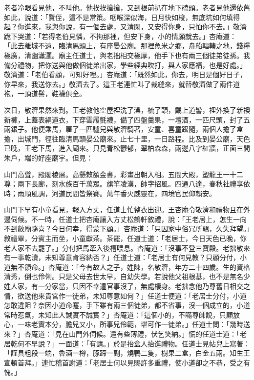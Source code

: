 老者冷眼看見他，不叫他。他挨挨搶搶，又到根前扒在地下磕頭。老者見他還依舊如此，說道：「賢侄，這不是常策。咽喉深似海，日月快如梭，無底坑如何填得起？你進來，我與你說，有一個去處，又清閑，又安得你身，只怕你不去。」敬濟跪下哭道：「若得老伯見憐，不拘那裡，但安下身，小的情願就去。」杏庵道： 「此去離城不遠，臨清馬頭上，有座晏公廟。那裡魚米之鄉，舟船輻輳之地，錢糧極廣，清幽瀟灑。廟主任道士，與老拙相交極厚，他手下也有兩三個徒弟徒孫。我備分禮物，把你送與他做個徒弟出家，學些經典吹打，與人家應福，也是好處。」敬濟道：「老伯看顧，可知好哩。」杏庵道：「既然如此，你去，明日是個好日子，你早來，我送你去。」敬濟去了。這王老連忙叫了裁縫來，就替敬濟做了兩件道袍，一頂道髻，鞋襪俱全。

次日，敬濟果然來到。王老教他空屋裡洗了澡，梳了頭，戴上道髻，裡外換了新襖新褲，上蓋表絹道衣，下穿雲履氈襪，備了四盤羹果，一壇酒，一匹尺頭，封了五兩銀子。他便乘馬，雇了一匹驢兒與敬濟騎著，安童、喜童跟隨，兩個人擔了盒擔，出城門，徑往臨清馬頭晏公廟來。止七十里，一日路程。比及到晏公廟，天色已晚，王老下馬，進入廟來。只見青松鬱郁，翠柏森森，兩邊八字紅牆，正面三間朱戶，端的好座廟宇。但見：

山門高聳，殿閣棱層。高懸敕額金書，彩畫出朝入相。五間大殿，塑龍王一十二尊；兩下長廊，刻水族百千萬眾。旗竿凌漢，帥字招風。四通八達，春秋社禮享依時；雨順風調，河道民間皆祭賽。萬年香火威靈在，四境官民仰賴安。

山門下早有小童看見，報入方丈，任道士忙整衣出迎。王杏庵令敬濟和禮物且在外邊伺候。不一時，任道士把杏庵讓入方丈松鶴軒敘禮，說：「王老居上，怎生一向不到敝廟隨喜？今日何幸，得蒙下顧。」杏庵道：「只因家中俗冗所羈，久失拜望。」敘禮畢，分賓主而坐，小童獻茶。茶罷，任道士道：「老居士，今日天色已晚，你老人家不去罷了。」分付把馬牽入後槽喂息。杏庵道：「沒事不登三寶殿。老拙敬來有一事乾瀆，未知尊意肯容納否？」任道士道：「老居士有何見教？只顧分付，小道無不領命。」杏庵道：「今有故人之子，姓陳，名敬濟，年方二十四歲。生的資格清秀，倒也伶俐。只是父母去世太早，自幼失學。若說他父祖根基，也不是無名少姓人家，有一分家當，只因不幸遭官事沒了，無處棲身。老拙念他乃尊舊日相交之情，欲送他來貴宮作一徒弟，未知尊意如何？」任道士便道：「老居士分付，小道怎敢違阻？奈因小道命蹇，手下雖有兩三個徒弟，都不省事，沒一個成立的，小道常時惹氣，未知此人誠實不誠實？」杏庵道：「這個小的，不瞞尊師說，只顧放心，一味老實本分，膽兒又小，所事兒伶範，堪可作一徒弟。」任道士問：「幾時送來？」杏庵道：「見在山門外伺候。還有些薄禮，伏乞笑納。」慌的任道士道：「老居乾何不早說？」一面道：「有請。」於是抬盒人抬進禮物。任道士見帖兒上寫著：「謹具粗段一端，魯酒一樽，豚蹄一副，燒鴨二隻，樹果二盒，白金五兩。知生王宣頓首拜。」連忙稽首謝道：「老居士何以見賜許多重禮，使小道卻之不恭，受之有愧。」

